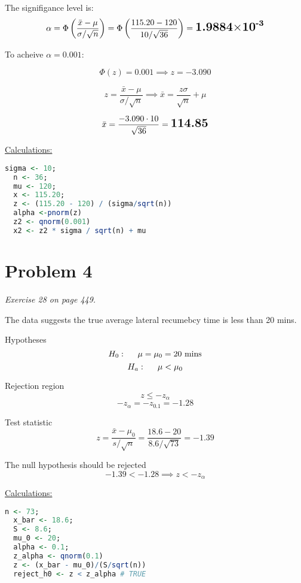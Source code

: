\documentclass[a4paper,11pt]{article}
\begin{document}
The signifigance level is:
\[
  \alpha =
  \Phi\left(\frac{\bar{x} - \mu}{\sigma/\sqrt{n}}\right) =
  \Phi\left(\frac{115.20 - 120}{10/\sqrt{36}}\right) = 
  \textbf{\Large{1.9884$\times$10$^{\textbf{-3}}$}}
\]


\vspace{1cm}
To acheive $\alpha = 0.001$:

\[\Phi(z) = 0.001 \implies z = -3.090 \]

\[
z = \frac{\bar{x} - \mu}{\sigma/\sqrt{n}} \implies
\bar{x} = \frac{z\sigma}{\sqrt{n}} + \mu
\]

\[
\bar{x} = \frac{-3.090 \cdot 10}{\sqrt{36}} = \textbf{\Large{114.85}}
\]

\underline{Calculations:}
\begin{lstlisting}[language=R]
  sigma <- 10;
  n <- 36;
  mu <- 120;
  x <- 115.20;
  z <- (115.20 - 120) / (sigma/sqrt(n))
  alpha <-pnorm(z)
  z2 <- qnorm(0.001)
  x2 <- z2 * sigma / sqrt(n) + mu
\end{lstlisting}
\clearpage


\section*{Problem 4}
\textit{Exercise 28 on page 449.} \newline

The data suggests the true average lateral recumebcy time is less than 
20 mins.\newline

Hypotheses
\[ H_0 : \hspace{5mm} \mu = \mu_0 = 20 \text{ mins}\]
\[ H_a : \hspace{5mm} \mu < \mu_0\]

Rejection region
\[ z \le -z_{\alpha}\]
\[ -z_{\alpha} = -z_{0.1} = -1.28\]\newline

Test statistic
\[ 
  z = 
  \frac{\bar{x} - \mu_0}{s/\sqrt{n}} =
  \frac{18.6 - 20}{8.6/\sqrt{73}} =
  -1.39
\]\newline

\Large{The null hypothesis should be rejected}
\[
 -1.39 < -1.28 \implies z < -z_{\alpha}
\]\newline

\large

\underline{Calculations:}
\begin{lstlisting}[language=R]
  n <- 73;
  x_bar <- 18.6;
  S <- 8.6;
  mu_0 <- 20;
  alpha <- 0.1;
  z_alpha <- qnorm(0.1)
  z <- (x_bar - mu_0)/(S/sqrt(n))
  reject_h0 <- z < z_alpha # TRUE
\end{lstlisting}
\clearpage
\end{document}
